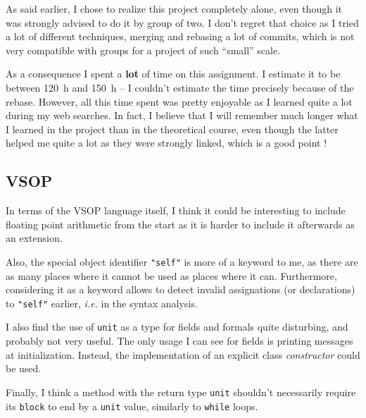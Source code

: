 \documentclass[a4paper, 12pt]{article}
\begin{document}
	As said earlier, I chose to realize this project completely alone, even though it was strongly advised to do it by group of two. I don't regret that choice as I tried a lot of different techniques, merging and rebasing a lot of commits, which is not very compatible with groups for a project of such \enquote{small} scale.
	
	As a consequence I spent a \textbf{lot} of time on this assignment. I estimate it to be between \SI{120}{h} and \SI{150}{h} -- I couldn't estimate the time precisely because of the rebase. However, all this time spent was pretty enjoyable as I learned quite a lot during my web searches. In fact, I believe that I will remember much longer what I learned in the project than in the theoretical course, even though the latter helped me quite a lot as they were strongly linked, which is a good point !
	
	\subsection{VSOP}
	
	In terms of the VSOP language itself, I think it could be interesting to include floating point arithmetic from the start as it is harder to include it afterwards as an extension.

    Also, the special object identifier \lstinline[style=vsop]{"self"} is more of a keyword to me, as there are as many places where it cannot be used as places where it can. Furthermore, considering it as a keyword allows to detect invalid assignations (or declarations) to \lstinline[style=vsop]{"self"} earlier, \emph{i.e.} in the syntax analysis.
    
    I also find the use of \lstinline[style=vsop]{unit} as a type for fields and formals quite disturbing, and probably not very useful. The only usage I can see for fields is printing messages at initialization. Instead, the implementation of an explicit class \emph{constructor} could be used.
    
    Finally, I think a method with the return type \lstinline[style=vsop]{unit} shouldn't necessarily require its \lstinline[style=vsop]{block} to end by a \lstinline[style=vsop]{unit} value, similarly to \lstinline[style=vsop]{while} loops.
	
\end{document}
